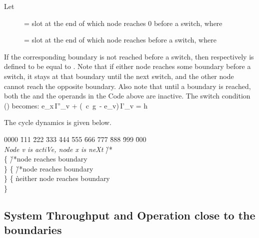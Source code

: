 \documentclass[12 pt]{article}
\newcommand{\debug}[1]{\mbox{\tt #1}}
\renewcommand{\debug}[1]{}              \newcommand{\cmd}[1]{}
\newcommand{\daddcontentsline}[3]{\addcontentsline{#1}{#2}{#3}}
\newcommand{\EE}[1]{ \debug{\fbox{\sname #1}}\label{\sname #1} \cmd{EAB}}
\newcommand{\prntvar}{\verb + itemsep = + \the\itemsep \verb + leftmargin = + \the\leftmargin \verb + leftskip = + \the\leftskip \verb + parindent = + \the\parindent \verb + leftmargini = + \the\leftmargini}
\renewcommand{\prntvar}{}
\newcommand{\msubsection}[2]{\subsection[#1 \debug{\fbox {#2}}]
	{#1 \cmd{msubsection} \dlabelx{#2}}\markboth{\today}{Sec. \thesection}}
\begin{document}
Let
\begin{description}
  \item[] = slot at the end of which node  reaches 0 before a switch, where 
  \item[] = slot at the end of which node  reaches  before a switch, where 
\end{description}
If the corresponding boundary is not reached before a switch, then  respectively is defined to be equal to .  Note that if either node reaches some boundary before a switch, it stays at that boundary until the next switch, and the other node cannot reach the opposite boundary.  Also note that until a boundary is reached, both the  and the  operands in the Code above are inactive.
The switch condition () becomes:
\EB
e_x\,\cdot I''_v + (\, c\, g\, - e_v)\,I'_v = h
\EE{eq-swCC}



The cycle dynamics is given below.




\renewcommand{\pname}{X}\daddcontentsline{lot}{table}{\debug{\fbox{\pname}}}



\begin{minipage}{\textwidtha}\setcounter{line}{0}\begin{tabbing}0000\debug{000} \= 111 \= 222 \= 333 \= 444 \= 555 \= 666 \= 777
\= 888 \= 999 \= 000 \kill
\prntvar\\{\em Node v is actiVe, node x is neXt} \` /*  \\
\> 
\> \{   \` /*node  reaches boundary 
\>\>		
\>\>		
\>\>      
\>\>       \\
	\>\>	\}
\>\{   \`/*node  reaches boundary 
\2        
\2        
\2        
\2         \\
    \2       \}
\> \{      \` neither node reaches boundary
\3            
\3            
\3             \\
    \2       \} \\



\end{tabbing}
\end{minipage}






\msubsection{System Throughput and Operation close to the boundaries}{low}
\end{document}
